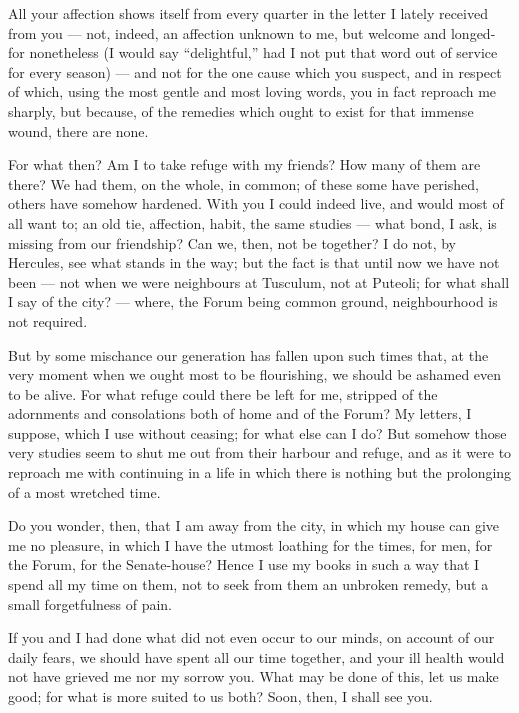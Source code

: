 

 All your affection shows itself from every quarter in the letter I lately received from you --- not, indeed, an affection unknown to me, but welcome and longed-for nonetheless (I would say ``delightful,'' had I not put that word out of service for every season) --- and not for the one cause which you suspect, and in respect of which, using the most gentle and most loving words, you in fact reproach me sharply, but because, of the remedies which ought to exist for that immense wound, there are none.

 For what then? Am I to take refuge with my friends? How many of them are there? We had them, on the whole, in common; of these some have perished, others have somehow hardened. With you I could indeed live, and would most of all want to; an old tie, affection, habit, the same studies --- what bond, I ask, is missing from our friendship? Can we, then, not be together? I do not, by Hercules, see what stands in the way; but the fact is that until now we have not been --- not when we were neighbours at Tusculum, not at Puteoli; for what shall I say of the city? --- where, the Forum being common ground, neighbourhood is not required.

 But by some mischance our generation has fallen upon such times that, at the very moment when we ought most to be flourishing, we should be ashamed even to be alive. For what refuge could there be left for me, stripped of the adornments and consolations both of home and of the Forum? My letters, I suppose, which I use without ceasing; for what else can I do? But somehow those very studies seem to shut me out from their harbour and refuge, and as it were to reproach me with continuing in a life in which there is nothing but the prolonging of a most wretched time.

 Do you wonder, then, that I am away from the city, in which my house can give me no pleasure, in which I have the utmost loathing for the times, for men, for the Forum, for the Senate-house? Hence I use my books in such a way that I spend all my time on them, not to seek from them an unbroken remedy, but a small forgetfulness of pain.

 If you and I had done what did not even occur to our minds, on account of our daily fears, we should have spent all our time together, and your ill health would not have grieved me nor my sorrow you. What may be done of this, let us make good; for what is more suited to us both? Soon, then, I shall see you.
